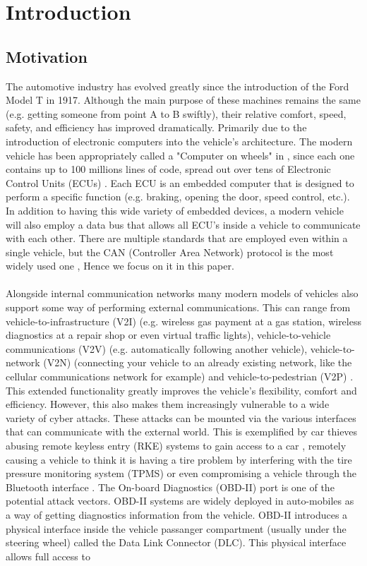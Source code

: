 \chapter{Introduction}
\label{sec:introduction}


\section{Motivation}
\label{sec:motivation}

The automotive industry has evolved greatly since the introduction of the Ford Model T in 1917. Although the main purpose of these machines remains the same (e.g. getting someone from point A to B swiftly), their relative comfort, speed, safety, and efficiency has improved dramatically. Primarily due to the introduction of electronic computers into the vehicle's architecture. The modern vehicle has been appropriately called a "Computer on wheels" in \cite{Klinedinst05}, since each one contains up to 100 millions lines of code, spread out over tens of Electronic Control Units (ECUs) \cite{Pike15}. Each ECU is an embedded computer that is designed to perform a specific function (e.g. braking, opening the door, speed control, etc.). In addition to having this wide variety of embedded devices, a modern vehicle will also employ a data bus that allows all ECU's inside a vehicle to communicate with each other. There are multiple standards that are employed even within a single vehicle, but the CAN (Controller Area Network) protocol is the most widely used one \cite{VatiCAN}, Hence we focus on it in this paper. \\ \\ Alongside internal communication networks many modern models of vehicles also support some way of performing external communications. This can range from vehicle-to-infrastructure (V2I) (e.g. wireless gas payment at a gas station, wireless diagnostics at a repair shop or even virtual traffic lights), vehicle-to-vehicle communications (V2V) (e.g. automatically following another vehicle), vehicle-to-network (V2N) (connecting your vehicle to an already existing network, like the cellular communications network for example) and vehicle-to-pedestrian (V2P) \cite{Kleberger15,Russel17,Ahmed}. This extended functionality greatly improves the vehicle's flexibility, comfort and efficiency. However, this also makes them increasingly vulnerable to a wide variety of cyber attacks. These attacks can be mounted via the various interfaces that can communicate with the external world. This is exemplified by car thieves abusing remote keyless entry (RKE) systems to gain access to a car \cite{KeeLoq,MillerA}, remotely causing a vehicle to think it is having a tire problem by interfering with the tire pressure monitoring system (TPMS) \cite{MillerA} or even compromising a vehicle through the Bluetooth interface \cite{Kosher2,Kosher}. The On-board Diagnostics (OBD-II) port is one of the potential attack vectors.  OBD-II systems are widely deployed in auto-mobiles as a way of getting diagnostics information from the vehicle. OBD-II introduces a physical interface inside the vehicle passanger compartment (usually under the steering wheel) called the Data Link Connector (DLC). This physical interface allows full access to 